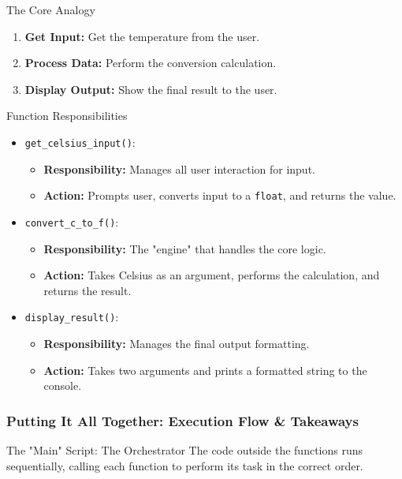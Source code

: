 \documentclass{beamer}
\begin{document}
\begin{frame}[fragile]
\begin{block}{The Core Analogy}
\begin{frame}[fragile]
    \begin{enumerate}
        \item \textbf{Get Input:} Get the temperature from the user.
        \item \textbf{Process Data:} Perform the conversion calculation.
        \item \textbf{Display Output:} Show the final result to the user.
    \end{enumerate}
    
    \begin{block}{Function Responsibilities}
    \begin{itemize}
        \item \texttt{get\_celsius\_input()}:
            \begin{itemize}
                \item \textbf{Responsibility:} Manages all user interaction for input.
                \item \textbf{Action:} Prompts user, converts input to a \texttt{float}, and returns the value.
            \end{itemize}
        \item \texttt{convert\_c\_to\_f()}:
            \begin{itemize}
                \item \textbf{Responsibility:} The "engine" that handles the core logic.
                \item \textbf{Action:} Takes Celsius as an argument, performs the calculation, and returns the result.
            \end{itemize}
        \item \texttt{display\_result()}:
            \begin{itemize}
                \item \textbf{Responsibility:} Manages the final output formatting.
                \item \textbf{Action:} Takes two arguments and prints a formatted string to the console.
            \end{itemize}
    \end{itemize}
    \end{block}
\end{frame}

\begin{frame}[fragile]
    \frametitle{Putting It All Together: Execution Flow \& Takeaways}
    
    \begin{block}{The "Main" Script: The Orchestrator}
    The code outside the functions runs sequentially, calling each function to perform its task in the correct order.
    

\end{block}
\end{frame}
\end{block}
\end{frame}
\end{document}

